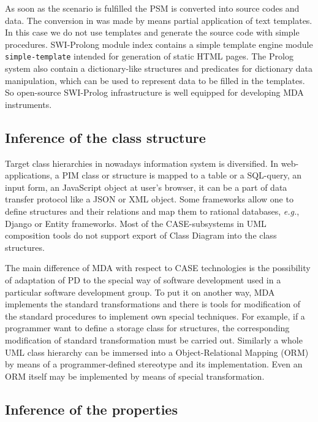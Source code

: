 \documentclass[conference,a4paper]{IEEEtran}
\begin{document}
As soon as the scenario is fulfilled the PSM is converted into source codes and data.  The conversion in \cite{tereh1} was made by means partial application of text templates.  In this case we do not use templates and generate the source code with simple procedures.  SWI-Prolong module index contains a simple template engine module \texttt{simple-template} intended for generation of static HTML pages.  The Prolog system also contain a dictionary-like structures and predicates for dictionary data manipulation, which can be used to represent data to be filled in the templates.  So open-source SWI-Prolog infrastructure is well equipped for developing MDA instruments.

\subsection{Inference of the class structure}
\label{sec:infstru}

Target class hierarchies in nowadays information system is diversified.  In web-applications, a PIM class or structure is mapped to a table or a SQL-query, an input form, an JavaScript object at user's browser, it can be a part of data transfer protocol like a JSON or XML object.  Some frameworks allow one to define structures and their relations and map them to rational databases, \emph{e.g.}, Django \cite{stratego} or Entity frameworks.  Most of the CASE-subsystems in UML composition tools do not support export of Class Diagram into the class structures.

The main difference of MDA with respect to CASE technologies is the possibility of adaptation of PD to the special way of software development used in a particular software development group.  To put it on another way, MDA implements the standard transformations and there is tools for modification of the standard procedures to implement own special techniques.  For example, if a programmer want to define a storage class for structures, the corresponding modification of standard transformation must be carried out.  Similarly a whole UML class hierarchy can be immersed into a Object-Relational Mapping (ORM) by means of a programmer-defined stereotype and its implementation.  Even an ORM itself may be implemented by means of special transformation.

\subsection{Inference of the properties}
\label{sec:infprop}
\end{document}
